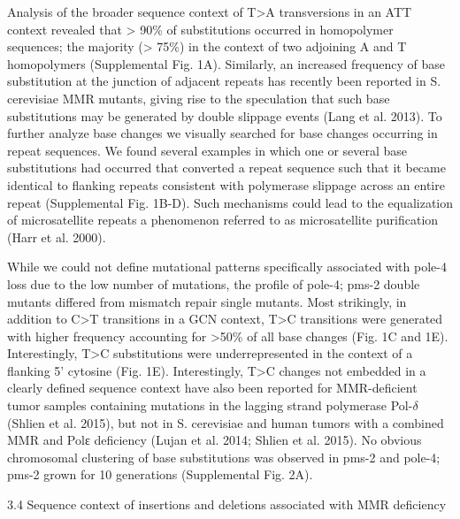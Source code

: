 Analysis of the broader sequence context of T>A transversions in an ATT context 
revealed that > 90\% of substitutions occurred in homopolymer sequences; the 
majority (> 75\%) in the context of two adjoining A and T homopolymers (Supplemental Fig. 1A). 
Similarly, an increased frequency of base substitution at the junction of adjacent 
repeats has recently been reported in S. cerevisiae MMR mutants, giving rise to the 
speculation that such base substitutions may be generated by double slippage events 
(Lang et al. 2013). To further analyze base changes we visually searched for base 
changes occurring in repeat sequences. We found several examples in which one or 
several base substitutions had occurred that converted a repeat sequence such 
that it became identical to flanking repeats consistent with polymerase slippage 
across an entire repeat (Supplemental Fig. 1B-D). Such mechanisms could lead 
to the equalization of microsatellite repeats a phenomenon referred to as 
microsatellite purification (Harr et al. 2000).


While we could not define mutational patterns specifically associated with pole-4 
loss due to the low number of mutations, the profile of pole-4; pms-2 double mutants 
differed from mismatch repair single mutants. Most strikingly, in addition to C>T 
transitions in a GCN context, T>C transitions were generated with higher frequency 
accounting for >50\% of all base changes (Fig. 1C and 1E). Interestingly, T>C 
substitutions were underrepresented in the context of a flanking 5’ cytosine (Fig. 1E). 
Interestingly, T>C changes not embedded in a clearly defined sequence context have also
been reported for MMR-deficient tumor samples containing mutations in the lagging strand 
polymerase Pol-$\delta$ (Shlien et al. 2015), but not in S. cerevisiae and human tumors 
with a combined MMR and Polε deficiency (Lujan et al. 2014; Shlien et al. 2015). No 
obvious chromosomal clustering of base substitutions was observed in pms-2 and 
pole-4; pms-2 grown for 10 generations (Supplemental Fig. 2A). 


3.4 Sequence context of insertions and deletions associated with MMR deficiency


